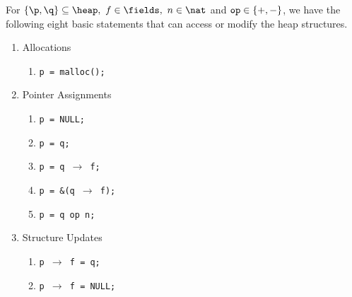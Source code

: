 For $\{\p, \q\} \subseteq \heap,\ f \in\fields,\ n \in \nat$
 and $\mbox{\tt op} \in \{+, -\}$, 
 we have the following eight basic statements that can access or modify the heap structures. 
 \begin{enumerate}
   \item Allocations
   	\begin{enumerate}
     	\item {\tt p = malloc();}
   	\end{enumerate}
   \item Pointer Assignments
   	\begin{enumerate}
     	\item {\tt p = NULL;}
     	\item {\tt p = q;}
     	\item {\tt p = q $\rightarrow$ f;}
     	\item {\tt p = \&(q $\rightarrow$ f);}
     	\item {\tt p = q op n;}
   	\end{enumerate}
   \item Structure Updates
   	\begin{enumerate}
     	\item {\tt p $\rightarrow$ f = q;}
     	\item {\tt p $\rightarrow$ f = NULL;}
   	\end{enumerate}
 \end{enumerate}

